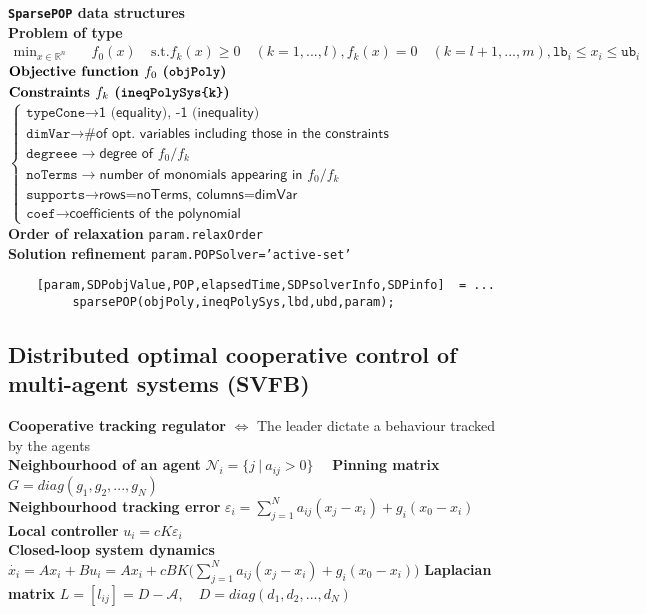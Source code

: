\documentclass[a4paper, 12pt]{article}
\begin{document}
\noindent
\textbf{\large\texttt{SparsePOP} data structures}\\
\textbf{Problem of type} $
\begin{aligned}
    \min_{x\in\mathbb{R}^n}  \quad & f_0(x) \ 
        &\text{s.t.} f_k(x)\ge 0 \quad (k=1,...,l), f_k(x)=0 \quad (k=l+1, ..., m), \texttt{lb}_i \le x_i \le \texttt{ub}_i
\end{aligned}$\\
$\begin{aligned}
    &\textbf{Objective function $f_0$ (\texttt{objPoly})} \\
    &\textbf{Constraints $f_k$ (\texttt{ineqPolySys\{k\}})}
\end{aligned}$
$\begin{cases}
    \texttt{typeCone} \to \textsf{1 (equality), -1 (inequality)}\\
    \texttt{dimVar}\to \textsf{\# of opt. variables including those in the constraints}\\
    \texttt{degreee} \to \textsf{degree of $f_0$/$f_k$}\\
    \texttt{noTerms} \to \textsf{number of monomials appearing in $f_0$/$f_k$} \\
    \texttt{supports} \to \textsf{rows=noTerms, columns=dimVar}\\
    \texttt{coef} \to \textsf{coefficients of the polynomial}
\end{cases}$
\\
\noindent
\textbf{Order of relaxation} \texttt{param.relaxOrder}\\
\textbf{Solution refinement} \texttt{param.POPSolver='active-set'}\\
\vspace{-1.5em}
{\color{blue}
\begin{verbatim}
    [param,SDPobjValue,POP,elapsedTime,SDPsolverInfo,SDPinfo]  = ... 
         sparsePOP(objPoly,ineqPolySys,lbd,ubd,param); 
\end{verbatim}
}


\subsection*{\color{red}Distributed optimal cooperative control of multi-agent systems (SVFB)}
\textbf{Cooperative tracking regulator} $\iff$ The leader dictate a behaviour tracked by the agents\\

\noindent
\textbf{Neighbourhood of an agent} $ \mathcal{N}_i = \{j \ | \ a_{ij}>0\} \quad$ \textbf{Pinning matrix}  $G=diag(g_1, g_2, ..., g_N)$\\
\textbf{Neighbourhood tracking error} $ \varepsilon_i = \sum_{j=1}^N {
    a_{ij}(x_j-x_i) + g_i (x_0-x_i)
}$
\textbf{Local controller} $u_i = cK\varepsilon_i$\\
\textbf{Closed-loop system dynamics}
$\dot{x_i} = A x_i + B u_i = A x_i + cBK \biggl(
    \sum_{j=1}^N {
    a_{ij}(x_j-x_i) + g_i (x_0-x_i)
}
\biggr)$
\textbf{Laplacian matrix} $ L=[l_{ij}] = D-\mathcal{A}, \quad
D=diag(d_1, d_2, ..., d_N) $\\
\end{document}
